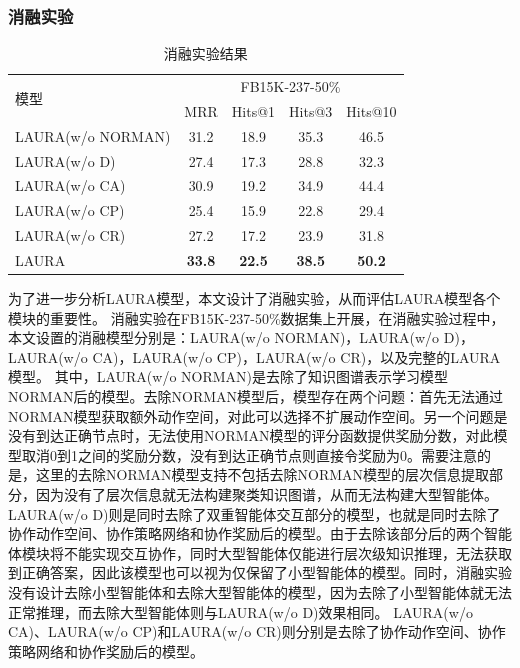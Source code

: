 \documentclass[algorithmlist, AutoFakeBold, AutoFakeSlant, figurelist, tablelist, nomlist, engineering]{seuthesix}
\begin{document}
\subsubsection{消融实验}
\begin{table}[t]
  \centering
  \caption{消融实验结果}
  \begin{tabular*}{0.95\textwidth}{@{\extracolsep{\fill}}lcccc}
    \toprule[1pt]
    \multirow{2}{*}{模型} & \multicolumn{4}{c}{FB15K-237-50\%} \\
      & MRR & Hits@1 & Hits@3 & Hits@10 \\ \hline
    LAURA(w/o NORMAN) & 31.2 & 18.9 & 35.3 & 46.5 \\
    LAURA(w/o D) & 27.4 & 17.3 & 28.8 & 32.3 \\
    LAURA(w/o CA) & 30.9 & 19.2 & 34.9 & 44.4 \\
    LAURA(w/o CP) & 25.4 & 15.9 & 22.8 & 29.4 \\
    LAURA(w/o CR) & 27.2 & 17.2 & 23.9 & 31.8 \\
    LAURA & \textbf{33.8} & \textbf{22.5} & \textbf{38.5} & \textbf{50.2} \\
    \bottomrule[1pt]
  \end{tabular*}
  \label{Experiment2_ablation}
\end{table}
为了进一步分析LAURA模型，本文设计了消融实验，从而评估LAURA模型各个模块的重要性。
消融实验在FB15K-237-50\%数据集上开展，在消融实验过程中，本文设置的消融模型分别是：LAURA(w/o NORMAN)，LAURA(w/o D)，LAURA(w/o CA)，LAURA(w/o CP)，LAURA(w/o CR)，以及完整的LAURA模型。
其中，LAURA(w/o NORMAN)是去除了知识图谱表示学习模型NORMAN后的模型。去除NORMAN模型后，模型存在两个问题：首先无法通过NORMAN模型获取额外动作空间，对此可以选择不扩展动作空间。另一个问题是没有到达正确节点时，无法使用NORMAN模型的评分函数提供奖励分数，对此模型取消0到1之间的奖励分数，没有到达正确节点则直接令奖励为0。需要注意的是，这里的去除NORMAN模型支持不包括去除NORMAN模型的层次信息提取部分，因为没有了层次信息就无法构建聚类知识图谱，从而无法构建大型智能体。
LAURA(w/o D)则是同时去除了双重智能体交互部分的模型，也就是同时去除了协作动作空间、协作策略网络和协作奖励后的模型。由于去除该部分后的两个智能体模块将不能实现交互协作，同时大型智能体仅能进行层次级知识推理，无法获取到正确答案，因此该模型也可以视为仅保留了小型智能体的模型。同时，消融实验没有设计去除小型智能体和去除大型智能体的模型，因为去除了小型智能体就无法正常推理，而去除大型智能体则与LAURA(w/o D)效果相同。
LAURA(w/o CA)、LAURA(w/o CP)和LAURA(w/o CR)则分别是去除了协作动作空间、协作策略网络和协作奖励后的模型。
\end{document}
